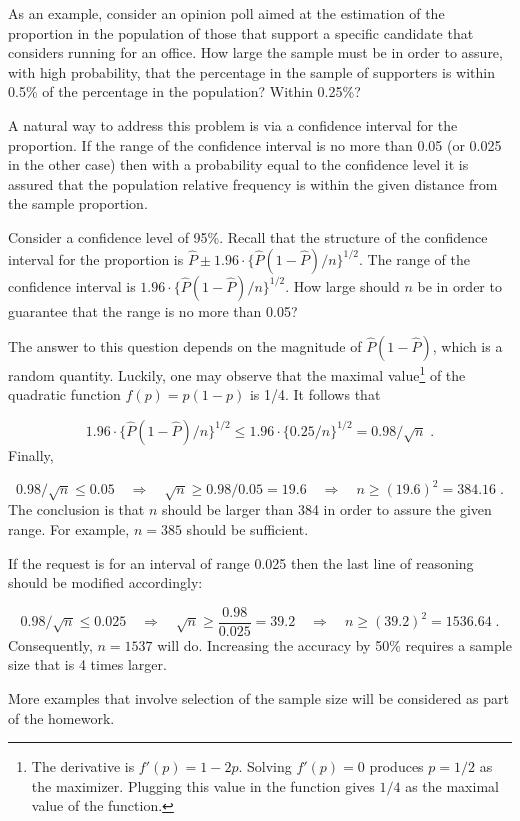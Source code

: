 \documentclass[]{krantz}
\theoremstyle{definition}
\theoremstyle{definition}
\theoremstyle{definition}
\theoremstyle{remark}
\begin{document}
As an example, consider an opinion poll aimed at the estimation of the
proportion in the population of those that support a specific candidate
that considers running for an office. How large the sample must be in
order to assure, with high probability, that the percentage in the
sample of supporters is within 0.5\% of the percentage in the population?
Within 0.25\%?

A natural way to address this problem is via a confidence interval for
the proportion. If the range of the confidence interval is no more than
0.05 (or 0.025 in the other case) then with a probability equal to the
confidence level it is assured that the population relative frequency is
within the given distance from the sample proportion.

Consider a confidence level of 95\%. Recall that the structure of the
confidence interval for the proportion is
\(\hat P \pm 1.96 \cdot \{\hat P (1-\hat P)/n\}^{1/2}\). The range of the
confidence interval is \(1.96 \cdot \{\hat P (1-\hat P)/n\}^{1/2}\). How
large should \(n\) be in order to guarantee that the range is no more than
0.05?

The answer to this question depends on the magnitude of
\(\hat P (1-\hat P)\), which is a random quantity. Luckily, one may
observe that the maximal value\footnote{The derivative is \(f'(p) = 1-2p\). Solving \(f'(p)=0\) produces
  \(p=1/2\) as the maximizer. Plugging this value in the function gives
  \(1/4\) as the maximal value of the function.} of the quadratic function
\(f(p) = p (1-p)\) is 1/4. It follows that

\[1.96 \cdot \{\hat P (1-\hat P)/n\}^{1/2} \leq 1.96 \cdot \{0.25/n\}^{1/2} = 0.98/\sqrt{n}\;.\]
Finally,

\[0.98/\sqrt{n} \leq 0.05 \quad \Longrightarrow \quad \sqrt{n} \geq 0.98/0.05 = 19.6
\quad \Longrightarrow \quad  n \geq (19.6)^2 = 384.16\;.\] The
conclusion is that \(n\) should be larger than 384 in order to assure the
given range. For example, \(n=385\) should be sufficient.

If the request is for an interval of range 0.025 then the last line of
reasoning should be modified accordingly:

\[0.98/\sqrt{n} \leq 0.025 \quad \Longrightarrow \quad \sqrt{n} \geq \frac{0.98}{0.025} = 39.2
\quad \Longrightarrow \quad  n \geq (39.2)^2 = 1536.64\;.\]
Consequently, \(n=1537\) will do. Increasing the accuracy by 50\% requires
a sample size that is 4 times larger.

More examples that involve selection of the sample size will be
considered as part of the homework.
\end{document}
